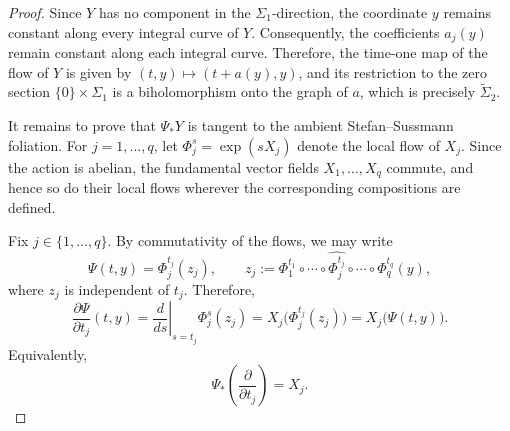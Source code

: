 \documentclass[10pt,a4paper]{amsart}
\begin{document}
\begin{proof}
	Since $Y$ has no component in the $\Sigma_1$-direction, the coordinate $y$ remains constant along every integral curve of $Y$.
	Consequently, the coefficients $a_j(y)$ remain constant along each integral curve.
	Therefore, the time-one map of the flow of $Y$ is given by $(t,y)\mapsto(t+a(y),y)$, and its restriction to the zero section $\{0\}\times\Sigma_1$ is a biholomorphism onto the graph of $a$, which is precisely $\widetilde{\Sigma}_2$.


It remains to prove that $\Psi_*Y$ is tangent to the ambient
Stefan--Sussmann foliation. For $j=1,\ldots,q$, let
$\Phi_j^s=\exp(sX_j)$ denote the local flow of $X_j$. Since the action
is abelian, the fundamental vector fields $X_1,\ldots,X_q$ commute,
and hence so do their local flows wherever the corresponding
compositions are defined.

 
Fix $j\in\{1,\ldots,q\}$. By commutativity of the flows, we may write
\[
    \Psi(t,y)=\Phi_j^{t_j}(z_j),
    \qquad
    z_j:=
    \Phi_1^{t_1}\circ\cdots\circ
    \widehat{\Phi_j^{t_j}}\circ\cdots\circ
    \Phi_q^{t_q}(y),
\]
where $z_j$ is independent of $t_j$. Therefore,
\[
    \frac{\partial\Psi}{\partial t_j}(t,y)
    =
    \left.\frac{d}{ds}\right|_{s=t_j}\Phi_j^s(z_j)
    =
    X_j\bigl(\Phi_j^{t_j}(z_j)\bigr)
    =
    X_j\bigl(\Psi(t,y)\bigr).
\]
Equivalently,
\[
    \Psi_*\!\left(\frac{\partial}{\partial t_j}\right)=X_j.
\]


\end{proof}
\end{document}
